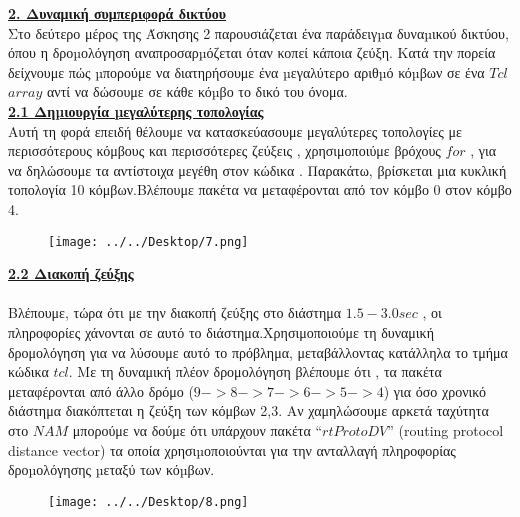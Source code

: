 \documentclass{article}%
\begin{document}
\textbf{{\underline{2. Δυναμική συμπεριφορά δικτύου }}} \\

Στο δεύτερο μέρος της Άσκησης 2 παρουσιάζεται ένα παράδειγµα δυναµικού δικτύου, όπου η
δροµολόγηση αναπροσαρµόζεται όταν κοπεί κάποια ζεύξη. Κατά την πορεία δείχνουμε πώς
µπορούμε  να διατηρήσουμε ένα µεγαλύτερο αριθµό κόµβων σε ένα $Tcl$ $array$ αντί να δώσουμε σε κάθε κόµβο
το δικό του όνομα. \\

\newpage
\textbf{{\underline{2.1 Δηµιουργία µεγαλύτερης τοπολογίας }}} \\
Αυτή τη φορά επειδή θέλουμε να κατασκεύασουμε μεγαλύτερες τοπολογίες με περισσότερους κόμβους και περισσότερες ζεύξεις , χρησιμοποιύμε βρόχους $for$ , για να δηλώσουμε τα αντίστοιχα μεγέθη στον κώδικα . Παρακάτω, βρίσκεται μια κυκλική τοπολογία 10 κόμβων.Βλέπουμε πακέτα να μεταφέρονται από τον κόμβο 0 στον κόμβο 4.
\begin{figure}[htbp]
	\centering
		\texttt{[image: ../../Desktop/7.png]}
	\label{fig:7}
\end{figure}

\textbf{{\underline{2.2 Διακοπή ζεύξης }}} \\\\
Βλέπουμε, τώρα ότι με την διακοπή ζεύξης στο διάστημα $ 1.5 -3.0 sec$ , οι πληροφορίες χάνονται σε αυτό το διάστημα.Χρησιμοποιούμε τη δυναμική δρομολόγηση για να λύσουμε αυτό το πρόβλημα, μεταβάλλοντας κατάλληλα το τμήμα κώδικα $tcl$. Με τη δυναμική πλέον δρομολόγηση βλέπουμε ότι , τα πακέτα μεταφέρονται από άλλο δρόμο ($ 9 -> 8 ->7->6->5->4$) για όσο χρονικό διάστημα διακόπτεται η ζεύξη των κόμβων 2,3. Αν χαμηλώσουμε αρκετά ταχύτητα στο $NAM$ μπορούμε να δούμε ότι υπάρχουν πακέτα “$rtProtoDV$” (\textlatin{routing protocol distance vector}) τα οποία
χρησιµοποιούνται για την ανταλλαγή πληροφορίας δροµολόγησης µεταξύ των κόµβων.
\begin{figure}[htbp]
	\centering
		\texttt{[image: ../../Desktop/8.png]}
	\label{fig:8}
\end{figure}

\newpage
\end{document}
